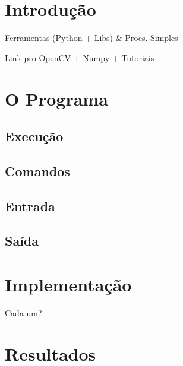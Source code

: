 \documentclass[assignment = 0]{homework}
\begin{document}
    \section{Introdução}
    Ferramentas (Python + Libs) \& Procs. Simples

    Link pro OpenCV + Numpy + Tutoriais

    \section{O Programa}
    \subsection{Execução}
    \subsection{Comandos}
    \subsection{Entrada}
    \subsection{Saída}

    \section{Implementação}
    Cada um?

    \section{Resultados}
\end{document}
